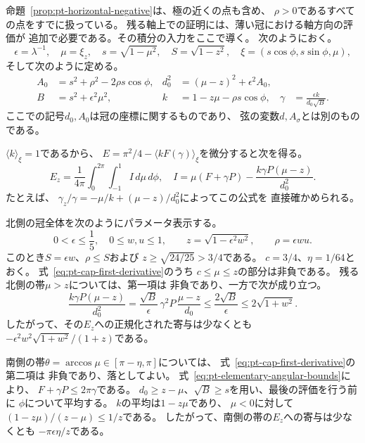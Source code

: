 命題~\ref{prop:pt-horizontal-negative}は、極の近くの点も含め、
$\rho>0$であるすべての点をすでに扱っている。
残る軸上での証明には、薄い冠における軸方向の評価が
追加で必要である。その積分の入力をここで導く。
次のようにおく。
\[
 \epsilon=\lambda^{-1},\quad
 \mu=\xi_z,\quad s=\sqrt{1-\mu^2},\quad
 S=\sqrt{1-z^2},\quad
 \xi=(s\cos\phi,s\sin\phi,\mu),
\]
そして次のように定める。
\begin{equation}
\begin{aligned}
 A_0&=s^2+\rho^2-2\rho s\cos\phi,&
 d_0^2&=(\mu-z)^2+\epsilon^2A_0,\\
 B&=s^2+\epsilon^2\mu^2,&
 k&=1-z\mu-\rho s\cos\phi,&
 \gamma&=\frac{\epsilon k}{d_0\sqrt B}.
\end{aligned}
\label{eq:pt-cap-variables}
\end{equation}
ここでの記号$d_0,A_0$は冠の座標に関するものであり、
弦の変数$d,A_\sigma$とは別のものである。

$\langle k\rangle_\xi=1$であるから、
$E=\pi^2/4-\langle kF(\gamma)\rangle_\xi$を微分すると次を得る。
\begin{equation}
 E_z=\frac{1}{4\pi}\int_0^{2\pi}\int_{-1}^1 I\,d\mu\,d\phi,
 \quad
 I=\mu(F+\gamma P)
       -\frac{k\gamma P(\mu-z)}{d_0^2}.
\label{eq:pt-cap-first-derivative}
\end{equation}
たとえば、
$\gamma_z/\gamma=-\mu/k+(\mu-z)/d_0^2$によってこの公式を
直接確かめられる。

北側の冠全体を次のようにパラメータ表示する。
\begin{equation}
 0<\epsilon\leq\frac15,\quad 0\leq w,u\leq1,\qquad
 z=\sqrt{1-\epsilon^2w^2},\qquad
 \rho=\epsilon wu.
\label{eq:pt-cap-parameterization}
\end{equation}
このとき$S=\epsilon w$、$\rho\leq S$および
$z\geq\sqrt{24/25}>3/4$である。
$c=3/4$、$\eta=1/64$とおく。
式~\eqref{eq:pt-cap-first-derivative}のうち
$c\leq\mu\leq z$の部分は非負である。
残る北側の帯$\mu>z$については、第一項は
非負であり、一方で次が成り立つ。
\[
 \frac{k\gamma P(\mu-z)}{d_0^2}
 =\frac{\sqrt B}{\epsilon}\,
   \gamma^2P\,\frac{\mu-z}{d_0}
 \leq \frac{2\sqrt B}{\epsilon}
 \leq2\sqrt{1+w^2}.
\]
したがって、その$E_z$への正規化された寄与は少なくとも
$-\epsilon^2w^2\sqrt{1+w^2}/(1+z)$である。

南側の帯$\theta=\arccos\mu\in[\pi-\eta,\pi]$については、
式~\eqref{eq:pt-cap-first-derivative}の第二項は
非負であり、落としてよい。
式~\eqref{eq:pt-elementary-angular-bounds}により、
$F+\gamma P\leq2\pi\gamma$である。
$d_0\geq z-\mu$、$\sqrt B\geq s$を用い、最後の評価を行う前に
$\phi$について平均する。
$k$の平均は$1-z\mu$であり、
$\mu<0$に対して$(1-z\mu)/(z-\mu)\leq1/z$である。
したがって、南側の帯の$E_z$への寄与は少なくとも
$-\pi\epsilon\eta/z$である。


